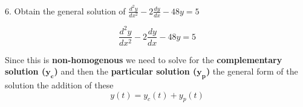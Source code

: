 \documentclass[a4paper, 12pt]{report}
\def\ni{green!60!black!40!white}
\begin{document}
    \newpage
    
    \begin{tcolorbox}[title={\color{black}\section{Q6}}, colback=white, colframe=\ni, boxrule=1mm, width=1\textwidth]
        6. Obtain the general solution of \( \frac{d^2 y}{dx^2} - 2 \frac{dy}{dx} - 48y = 5 \)
    \end{tcolorbox}

        \[ \frac{d^2 y}{dx^2} - 2 \frac{dy}{dx} - 48y = 5 \]
        
        Since this is \textbf{non-homogenous} we need to solve for the \textbf{complementary solution (\(\bm{y_c}\))} and then the \textbf{particular solution ($\bm{y_p}$)} the general form of the solution the addition of these $$y(t)=y_c(t)+y_p(t)$$
\end{document}
